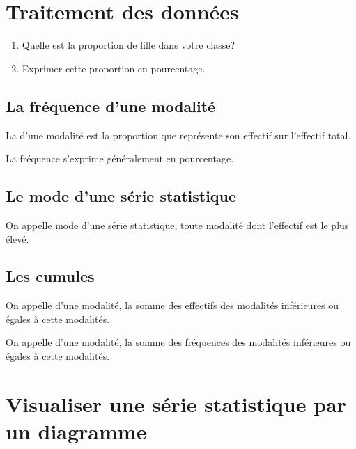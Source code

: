 \documentclass[12pt,a4paper]{report}
\begin{document}
\chapter{Traitement des données} 
\begin{act}
\begin{enumerate}
\item Quelle est la proportion de fille dans votre classe?
\item Exprimer cette proportion en pourcentage.
\end{enumerate}
\end{act}

\section{La fréquence d'une modalité}
\begin{defn}
La  d'une modalité est la proportion que représente son effectif sur l'effectif total.
\end{defn}

\begin{memento}
La fréquence s'exprime généralement en pourcentage.\\
\end{memento}

\section{Le mode d'une série statistique}
\begin{defn}
On appelle mode d'une série statistique, toute modalité dont l'effectif est le plus élevé.
\end{defn}
\section{Les cumules}
\begin{defns}
\item On appelle  d'une modalité, la somme des effectifs des modalités inférieures ou égales à cette modalités.
\item On appelle  d'une modalité, la somme des fréquences des modalités inférieures ou égales à cette modalités.
\end{defns}

\chapter{Visualiser une série statistique par un diagramme}
\end{document}
